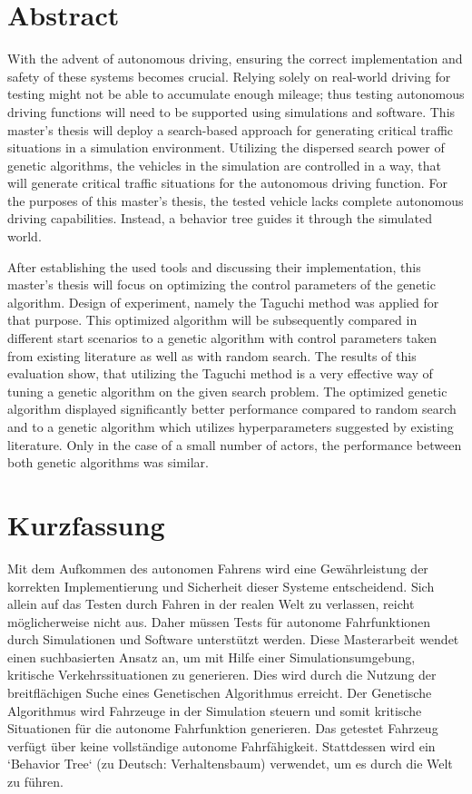 \chapter*{Abstract}
\label{chap:abstract}

With the advent of autonomous driving, ensuring the correct implementation and safety of these systems becomes crucial. Relying solely on real-world driving for testing might not be able to accumulate enough mileage; thus testing autonomous driving functions will need to be supported using simulations and software. This master's thesis will deploy a search-based approach for generating critical traffic situations in a simulation environment. Utilizing the dispersed search power of genetic algorithms, the vehicles in the simulation are controlled in a way, that will generate critical traffic situations for the autonomous driving function. For the purposes of this master's thesis, the tested vehicle lacks complete autonomous driving capabilities. Instead, a behavior tree guides it through the simulated world.

After establishing the used tools and discussing their implementation, this master's thesis will focus on optimizing the control parameters of the genetic algorithm. Design of experiment, namely the Taguchi method was applied for that purpose. This optimized algorithm will be subsequently compared in different start scenarios to a genetic algorithm with control parameters taken from existing literature as well as with random search. The results of this evaluation show, that utilizing the Taguchi method is a very effective way of tuning a genetic algorithm on the given search problem. The optimized genetic algorithm displayed significantly better performance compared to random search and to a genetic algorithm which utilizes hyperparameters suggested by existing literature. Only in the case of a small number of actors, the performance between both genetic algorithms was similar.


\chapter*{Kurzfassung}
\label{chap:kurzfassung}
Mit dem Aufkommen des autonomen Fahrens wird eine Gewährleistung der korrekten Implementierung und Sicherheit dieser Systeme entscheidend. Sich allein auf das Testen durch Fahren in der realen Welt zu verlassen, reicht möglicherweise nicht aus. Daher müssen Tests für autonome Fahrfunktionen durch Simulationen und Software unterstützt werden. Diese Masterarbeit wendet einen suchbasierten Ansatz an, um mit Hilfe einer Simulationsumgebung, kritische Verkehrssituationen zu generieren. Dies wird durch die Nutzung der breitflächigen Suche eines Genetischen Algorithmus erreicht. Der Genetische Algorithmus wird Fahrzeuge in der Simulation steuern und somit kritische Situationen für die autonome Fahrfunktion generieren. Das getestet Fahrzeug verfügt über keine vollständige autonome Fahrfähigkeit. Stattdessen wird ein ‘Behavior Tree‘ (zu Deutsch: Verhaltensbaum) verwendet, um es durch die Welt zu führen.

